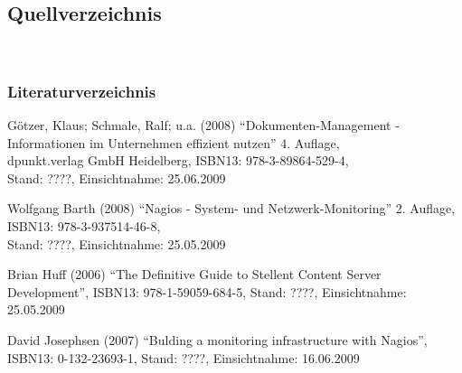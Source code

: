 \documentclass[12pt, a4paper, headsepline]{article}
\begin{document}
\subsection{Quellverzeichnis}

\\

\subsubsection{Literaturverzeichnis}

\begin{thebibliography}{xxxxxxxx}
	 Götzer, Klaus; Schmale, Ralf; u.a. (2008) "`Dokumenten-Management - Informationen im Unternehmen effizient nutzen"' 4. Auflage,\\
	 dpunkt.verlag GmbH Heidelberg,  
	 ISBN13: 978-3-89864-529-4,\\
	 Stand: ????, Einsichtnahme: 25.06.2009

	 Wolfgang Barth (2008) "`Nagios - System- und Netzwerk-Monitoring"' 2. Auflage, \\
	 ISBN13: 978-3-937514-46-8, \\
	 Stand: ????, Einsichtnahme: 25.05.2009
	 
	 Brian Huff (2006) "`The Definitive Guide to Stellent Content Server Development"', \newline ISBN13: 978-1-59059-684-5, \newline Stand: ????, Einsichtnahme: 25.05.2009

	 David Josephsen (2007) "`Bulding a monitoring infrastructure with Nagios"', \newline ISBN13: 0-132-23693-1, \newline Stand: ????, Einsichtnahme: 16.06.2009
	 	
\end{thebibliography}
\newpage
\end{document}
